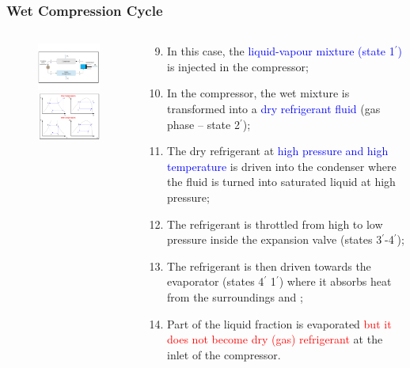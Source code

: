 \documentclass[10pt,compress]{beamer}
\begin{document}
\begin{frame}
 \frametitle{Wet Compression Cycle} 
  \begin{columns}
   \begin{column}[c]{0.5\linewidth}
    \begin{figure}%
     \vbox{
      \includegraphics[width=5.5cm,clip]{./Pics/Overview_Refrig12}
      \vspace{-.5cm}
      \includegraphics[width=4.5cm,clip]{./Pics/Overview_Refrig13}}
    \end{figure}  
   \end{column}  
   \begin{column}[c]{0.5\linewidth}
  \begin{enumerate}[(1)] \setcounter{enumi}{8}\scriptsize
     \item <1-> In this case, the \textcolor{blue}{liquid-vapour mixture (state 1$^{\prime}$)} is injected in the compressor;
     \item <1-> In the compressor, the wet mixture is transformed into a \textcolor{blue}{dry refrigerant fluid} (gas phase -- state 2$^{\prime}$);
     \item <1-> The dry refrigerant at \textcolor{blue}{high pressure and high temperature} is driven into the condenser where the fluid is turned into saturated liquid at high pressure;
     \item <1-> The refrigerant is throttled from high to low pressure inside the expansion valve (states 3$^{\prime}$-4$^{\prime}$);
     \item <1-> The refrigerant is then driven towards the evaporator (states 4$^{\prime}$ 1$^{\prime}$) where it absorbs heat from the surroundings and ;
     \item <1-> Part of the liquid fraction is evaporated \textcolor{red}{but it does not become dry (gas) refrigerant} at the inlet of the compressor.

  \end{enumerate}
 \end{column}  
\end{columns}
\end{frame}
\end{document}
